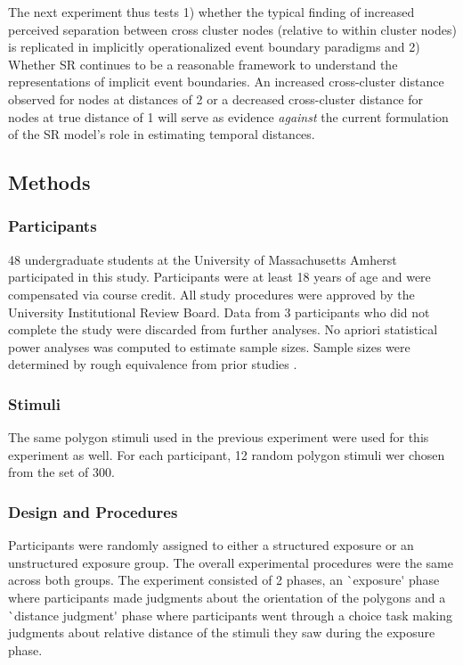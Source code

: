 The next experiment thus tests 1) whether the typical finding of increased perceived separation between cross cluster nodes (relative to within cluster nodes) is replicated in implicitly operationalized event boundary paradigms and \ac{2) Whether SR continues to be a reasonable framework to understand the representations of implicit event boundaries.} An increased cross-cluster distance observed for nodes at distances of 2 or a decreased cross-cluster distance for nodes at true distance of 1 will serve as evidence \textit{against} the current formulation of the SR model's role in estimating temporal distances. 

\subsection{Methods}
\subsubsection*{Participants}
48 undergraduate students at the University of Massachusetts Amherst participated in this study. Participants were at least 18 years of age and were compensated via course credit. All study procedures were approved by the University Institutional Review Board. Data from 3 participants who did not complete the study were discarded from further analyses. No apriori statistical power analyses was computed to estimate sample sizes. Sample sizes were determined by rough equivalence from prior studies \parencite{heusser2018perceptual,dubrow2013influence}. 

\subsubsection*{Stimuli}
\ac{The same polygon stimuli used in the previous experiment were used for this experiment as well. For each participant, 12 random polygon stimuli wer chosen from the set of 300.}

\subsubsection*{Design and Procedures}
Participants were randomly assigned to either a structured exposure or an unstructured exposure group. The overall experimental procedures were the same across both groups. \ac{The experiment consisted of 2 phases, an `exposure' phase where participants made judgments about the orientation of the polygons and a `distance judgment' phase where participants went through a choice task making judgments about relative distance of the stimuli they saw during the exposure phase.}

